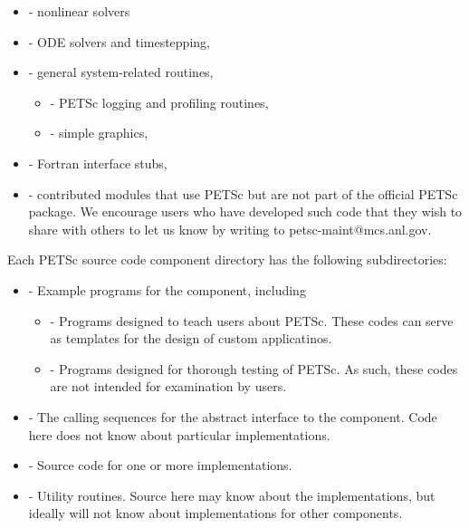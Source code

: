 \begin{itemize}
\begin{itemize}
\begin{itemize}
 \end{itemize}
 \item {} - nonlinear solvers
 \item {} - ODE solvers and timestepping,
 \item {} - general system-related routines,
 \begin{itemize}
   \item {} - PETSc logging and profiling routines,
   \item {} - simple graphics,
 \end{itemize}
 \item {} - Fortran interface stubs,
 \item {} - contributed modules that use PETSc but are not
    part of the official PETSc package.  We encourage users who have
    developed such code that they wish to share with others to let us
    know by writing to petsc-maint@mcs.anl.gov.
 \end{itemize}
\end{itemize}

Each PETSc source code component directory has the following subdirectories:
\begin{itemize}
\item  {} - Example programs for the component, including
  \begin{itemize}
  \item {} - Programs designed to teach users about PETSc.  These
          codes can serve as templates for the design of custom applicatinos.
  \item {} - Programs designed for thorough testing of PETSc.  As such,
          these codes are not intended for examination by users.
  \end{itemize}
\item  {} - The calling sequences for the abstract interface  
        to the component.
        Code here does not know about particular implementations.
\item  {} - Source code for one or more implementations.
\item  {} - Utility routines.  Source here may know about the 
          implementations, but ideally will not know about implementations
          for other components.
\end{itemize}

%
%


